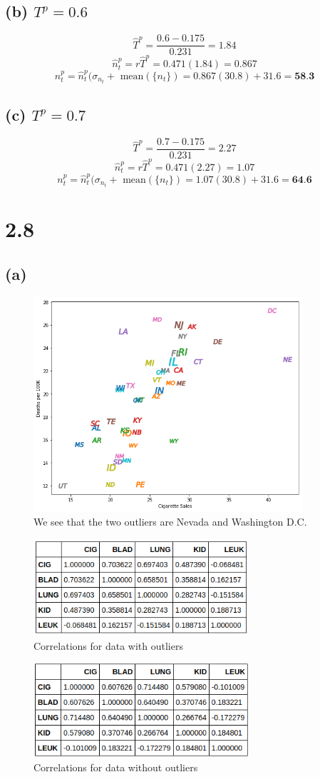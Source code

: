 \documentclass[11pt]{article}
\begin{document}
\subsection*{(b) $T^p=0.6$}
\[\hat{T}^p=\frac{0.6-0.175}{0.231}=1.84\]
\[\hat{n}_t^p=r\hat{T}^p=0.471(1.84)=0.867\]
\[n_t^p=\hat{n}_t^p(\sigma_{n_t}+\text{ mean}(\{n_t\})=0.867(30.8)+31.6=\textbf{58.3}\]
\subsection*{(c) $T^p=0.7$}
\[\hat{T}^p=\frac{0.7-0.175}{0.231}=2.27\]
\[\hat{n}_t^p=r\hat{T}^p=0.471(2.27)=1.07\]
\[n_t^p=\hat{n}_t^p(\sigma_{n_t}+\text{ mean}(\{n_t\})=1.07(30.8)+31.6=\textbf{64.6}\]
\clearpage
\section*{2.8}
\subsection*{(a)}
\begin{figure}[h!]
	\centering
	\includegraphics[width=100mm]{lung_cig.png}
	\caption{We see that the two outliers are Nevada and Washington D.C.}
\end{figure}
\begin{figure}[h!]
	\centering
	\includegraphics[width=80mm]{with_outliers_corr.png}
	\caption{Correlations for data with outliers}
\end{figure}
\begin{figure}[h!]
	\centering
	\includegraphics[width=80mm]{wo_outliers_corr.png}
	\caption{Correlations for data without outliers}
\end{figure}
\clearpage
\end{document}

